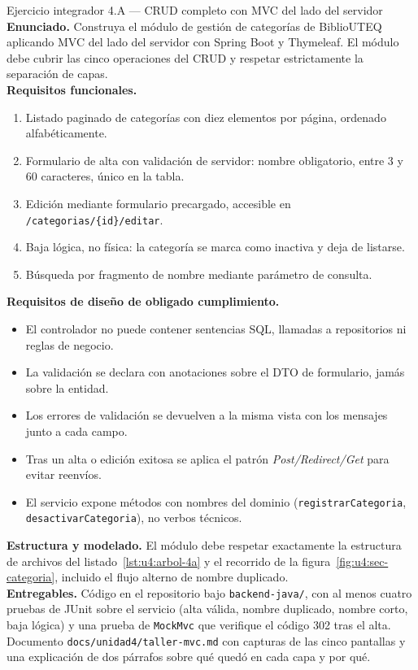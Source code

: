 \documentclass[11pt,a4paper,openany]{book}
\begin{document}
\begin{cajaejercicio}{Ejercicio integrador 4.A --- CRUD completo con MVC del lado del servidor}
	\textbf{Enunciado.} Construya el módulo de gestión de categorías de BiblioUTEQ aplicando MVC del lado del servidor con Spring Boot y Thymeleaf. El módulo debe cubrir las cinco operaciones del CRUD y respetar estrictamente la separación de capas.\\[4pt]
	\textbf{Requisitos funcionales.}
	\begin{enumerate}
		\item Listado paginado de categorías con diez elementos por página, ordenado alfabéticamente.
		\item Formulario de alta con validación de servidor: nombre obligatorio, entre 3 y 60 caracteres, único en la tabla.
		\item Edición mediante formulario precargado, accesible en \texttt{/categorias/\{id\}/editar}.
		\item Baja lógica, no física: la categoría se marca como inactiva y deja de listarse.
		\item Búsqueda por fragmento de nombre mediante parámetro de consulta.
	\end{enumerate}
	\textbf{Requisitos de diseño de obligado cumplimiento.}
	\begin{itemize}
		\item El controlador no puede contener sentencias SQL, llamadas a repositorios ni reglas de negocio.
		\item La validación se declara con anotaciones sobre el DTO de formulario, jamás sobre la entidad.
		\item Los errores de validación se devuelven a la misma vista con los mensajes junto a cada campo.
		\item Tras un alta o edición exitosa se aplica el patrón \emph{Post/Redirect/Get} para evitar reenvíos.
		\item El servicio expone métodos con nombres del dominio (\texttt{registrarCategoria}, \texttt{desactivarCategoria}), no verbos técnicos.
	\end{itemize}
	\textbf{Estructura y modelado.} El módulo debe respetar exactamente la estructura de archivos del listado~\ref{lst:u4:arbol-4a} y el recorrido de la figura~\ref{fig:u4:sec-categoria}, incluido el flujo alterno de nombre duplicado.\\[4pt]
	\textbf{Entregables.} Código en el repositorio bajo \texttt{backend-java/}, con al menos cuatro pruebas de JUnit sobre el servicio (alta válida, nombre duplicado, nombre corto, baja lógica) y una prueba de \texttt{MockMvc} que verifique el código 302 tras el alta. Documento \texttt{docs/unidad4/taller-mvc.md} con capturas de las cinco pantallas y una explicación de dos párrafos sobre qué quedó en cada capa y por qué.\\[4pt]

\end{cajaejercicio}
\end{document}

